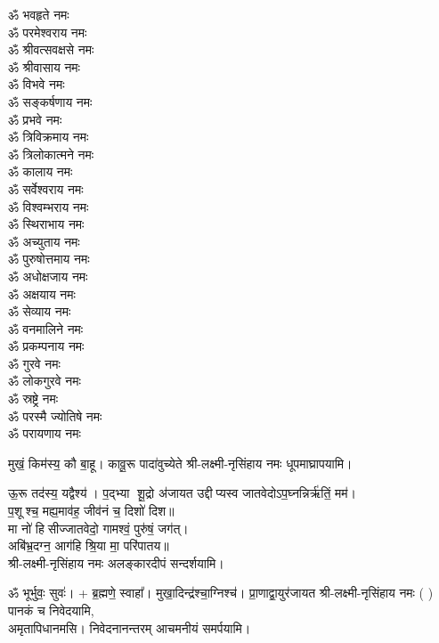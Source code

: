 \begin{center}
\begin{multicols}{2}
\begin{flushleft}
ॐ भवहृते नमः\\
ॐ परमेश्वराय नमः\\
ॐ श्रीवत्सवक्षसे नमः\\
ॐ श्रीवासाय नमः\\
ॐ विभवे नमः\\
ॐ सङ्कर्षणाय नमः\\
ॐ प्रभवे नमः\hfill{}\\
ॐ त्रिविक्रमाय नमः\\
ॐ त्रिलोकात्मने नमः\\
ॐ कालाय नमः\\
ॐ सर्वेश्वराय नमः\\
ॐ विश्वम्भराय नमः\\
ॐ स्थिराभाय नमः\\
ॐ अच्युताय नमः\\
ॐ पुरुषोत्तमाय नमः\\
ॐ अधोक्षजाय नमः\\
ॐ अक्षयाय नमः\hfill{}\\
ॐ सेव्याय नमः\\
ॐ वनमालिने नमः\\
ॐ प्रकम्पनाय नमः\\
ॐ गुरवे नमः\\
ॐ लोकगुरवे नमः\\
ॐ स्रष्ट्रे नमः\\
ॐ परस्मै ज्योतिषे नमः\\
ॐ परायणाय नमः\hfill{}\\
\end{flushleft}
\end{multicols}

  

{मुखं॒ किम॑स्य॒ कौ बा॒हू। कावू॒रू पादा॑वुच्येते}
श्री-लक्ष्मी-नृसिंहाय नमः धूपमाघ्रापयामि।\medskip
 
{ऊ॒रू तद॑स्य॒ यद्वैश्य॑। प॒द्भ्या शू॒द्रो अ॑जायत}
उद्दीप्यस्व जातवेदोऽप॒घ्नन्निर्ऋ॑तिं॒ मम॑।\\
 प॒शूश्च॒ मह्य॒माव॑ह॒ जीव॑नं च॒ दिशो॑ दिश॥ \\
मा नो॑ हिसीज्जातवेदो॒ गामश्वं॒ पुरु॑षं॒ जग॑त्।\\
अबि॑भ्र॒दग्न॒ आग॑हि श्रि॒या मा॒ परि॑पातय॥ \\
श्री-लक्ष्मी-नृसिंहाय नमः अलङ्कारदीपं सन्दर्शयामि।\medskip

ॐ भूर्भुवः॒ सुवः॑। + ब्र॒ह्मणे॒ स्वाहा᳚।
 {मुखा॒दिन्द्र॑श्चा॒ग्निश्च॑। प्रा॒णाद्वा॒युर॑जायत}
श्री-लक्ष्मी-नृसिंहाय नमः (	) पानकं   च   निवेदयामि, \\
अमृतापिधानमसि। निवेदनानन्तरम् आचमनीयं समर्पयामि।\medskip


\end{center}
